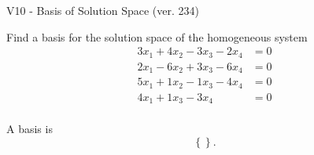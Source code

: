 \begin{exercise}
  \begin{exerciseTitle}V10 - Basis of Solution Space (ver. 234)\end{exerciseTitle}
  \begin{exerciseStatement}
    Find a basis for the solution space of the homogeneous system 
\begin{align*}
 3 x_ 1 + 4 x_ 2 -3 x_ 3 -2 x_ 4 &= 0  \\ 
  2 x_ 1 -6 x_ 2 + 3 x_ 3 -6 x_ 4 &= 0  \\ 
  5 x_ 1 + 1 x_ 2 -1 x_ 3 -4 x_ 4 &= 0  \\ 
  4 x_ 1 + 1 x_ 3 -3 x_ 4 &= 0  \\ 
 \end{align*}


 
  \end{exerciseStatement}

  \begin{exerciseAnswer}
   A basis is   
\[\left\{\right\}.\]

  


  \end{exerciseAnswer}
\end{exercise}